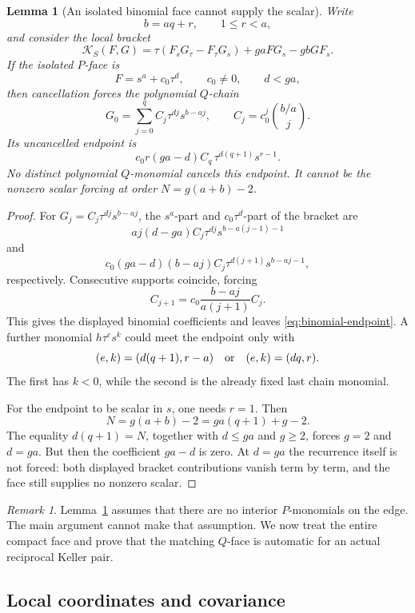 \documentclass[11pt]{article}
\newtheorem{lemma}[theorem]{Lemma}
\theoremstyle{definition}
\theoremstyle{remark}
\newtheorem{remark}[theorem]{Remark}
\newcommand{\KS}{\mathcal K_S}
\begin{document}
\begin{lemma}[An isolated binomial face cannot supply the scalar]
\label{lem:binomial}
Write
\[
 b=aq+r,\qquad 1\leq r<a,
\]
and consider the local bracket
\[
 \KS(F,G)
 =\tau(F_sG_\tau-F_\tau G_s)+gaFG_s-gbGF_s.
\]
If the isolated \(P\)-face is
\[
 F=s^a+c_0\tau^d,\qquad c_0\neq0,\qquad d<ga,
\]
then cancellation forces the polynomial \(Q\)-chain
\[
 G_0=\sum_{j=0}^{q}C_j\tau^{dj}s^{b-aj},
 \qquad
 C_j=c_0^j\binom{b/a}{j}.
\]
Its uncancelled endpoint is
\begin{equation}
 c_0r(ga-d)C_q\,\tau^{d(q+1)}s^{r-1}.
\label{eq:binomial-endpoint}
\end{equation}
No distinct polynomial \(Q\)-monomial cancels this endpoint.
It cannot be the nonzero scalar forcing at order
\(N=g(a+b)-2\).
\end{lemma}

\begin{proof}
For \(G_j=C_j\tau^{dj}s^{b-aj}\), the \(s^a\)-part and
\(c_0\tau^d\)-part of the bracket are
\[
 aj(d-ga)C_j\tau^{dj}s^{b-a(j-1)-1}
\]
and
\[
 c_0(ga-d)(b-aj)C_j
 \tau^{d(j+1)}s^{b-aj-1},
\]
respectively.  Consecutive supports coincide, forcing
\[
 C_{j+1}
 =c_0\frac{b-aj}{a(j+1)}C_j.
\]
This gives the displayed binomial coefficients and leaves
\eqref{eq:binomial-endpoint}.  A further monomial
\(h\tau^es^k\) could meet the endpoint only with
\[
 (e,k)=(d(q+1),r-a)
 \quad\hbox{or}\quad
 (e,k)=(dq,r).
\]
The first has \(k<0\), while the second is the already fixed last
chain monomial.

For the endpoint to be scalar in \(s\), one needs \(r=1\).  Then
\[
 N=g(a+b)-2=ga(q+1)+g-2.
\]
The equality \(d(q+1)=N\), together with \(d\leq ga\) and \(g\geq2\),
forces \(g=2\) and \(d=ga\).  But then the coefficient
\(ga-d\) is zero.  At \(d=ga\) the recurrence itself is not forced:
both displayed bracket contributions vanish term by term, and the face
still supplies no nonzero scalar.
\end{proof}

\begin{remark}
Lemma~\ref{lem:binomial} assumes that there are no interior
\(P\)-monomials on the edge.  The main argument cannot make that
assumption.  We now treat the entire compact face and prove that the
matching \(Q\)-face is automatic for an actual reciprocal Keller pair.
\end{remark}

\subsection{Local coordinates and covariance}
\end{document}
